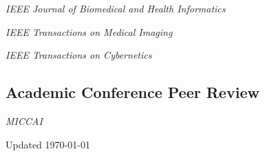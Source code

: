 \documentclass[12pt,letterpaper]{report}
\newcommand{\listitemspace}{0.15em}
\renewenvironment{itemize}
{\begin{list}{}{\setlength{\leftmargin}{0em}
			\setlength{\parskip}{0em}
			\setlength{\itemsep}{\listitemspace}
			\setlength{\parsep}{\listitemspace}}}
	{\end{list}}
\begin{document}
	\begin{itemize}
		
		\item \textit{IEEE Journal of Biomedical and Health Informatics}
		\item \textit{IEEE Transactions on Medical Imaging}
		\item \textit{IEEE Transactions on Cybernetics}
		
	\end{itemize}
	
	\subsection*{Academic Conference Peer Review}
	
	\begin{itemize}
		
		\item \textit{MICCAI}
		
	\end{itemize}
	
	\begin{center}
		\vfill
		Updated \monthyeardate\today
	\end{center}
	
	
\end{document}
